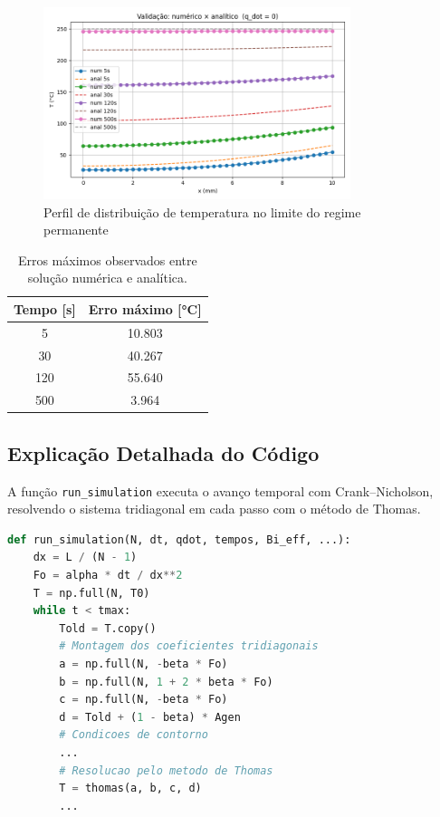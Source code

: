 \documentclass[12pt]{article}
\begin{document}
\begin{figure}[H]
    \centering
    \includegraphics[width=0.8\textwidth]{img/Figure_5.png}
    \caption{Perfil de distribuição de temperatura no limite do regime permanente}
    \label{fig:validacao_analitica}
\end{figure}

\begin{table}[H]
    \centering
    \caption{Erros máximos observados entre solução numérica e analítica.}
    \label{tab:erros_analitica}
    \begin{tabular}{cc}
        \toprule
        Tempo [s] & Erro máximo [°C] \\
        \midrule
        5   & 10.803 \\
        30  & 40.267 \\
        120 & 55.640 \\
        500 & 3.964 \\
        \bottomrule
    \end{tabular}
\end{table}

\subsection{Explicação Detalhada do Código}

A função \texttt{run\_simulation} executa o avanço temporal com Crank–Nicholson, resolvendo o sistema tridiagonal em cada passo com o método de Thomas.

\begin{lstlisting}[language=Python, caption=Código - Solver da condução transiente]
def run_simulation(N, dt, qdot, tempos, Bi_eff, ...):
    dx = L / (N - 1)
    Fo = alpha * dt / dx**2
    T = np.full(N, T0)
    while t < tmax:
        Told = T.copy()
        # Montagem dos coeficientes tridiagonais
        a = np.full(N, -beta * Fo)
        b = np.full(N, 1 + 2 * beta * Fo)
        c = np.full(N, -beta * Fo)
        d = Told + (1 - beta) * Agen
        # Condicoes de contorno
        ...
        # Resolucao pelo metodo de Thomas
        T = thomas(a, b, c, d)
        ...
\end{lstlisting}
\end{document}

